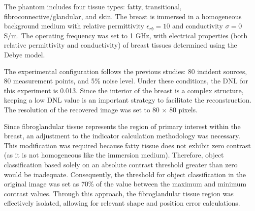 \documentclass{IEEEtran}
\begin{document}
            The phantom includes four tissue types: fatty, transitional, fibroconnective/glandular, and skin. The breast is immersed in a homogeneous background medium with relative permittivity $\epsilon_{rb} = 10$ and conductivity $\sigma = 0$ S/m. The operating frequency was set to 1 GHz, with electrical properties (both relative permittivity and conductivity) of breast tissues determined using the Debye model.

            The experimental configuration follows the previous studies: 80 incident sources, 80 measurement points, and 5\% noise level. Under these conditions, the DNL for this experiment is 0.013. Since the interior of the breast is a complex structure, keeping a low DNL value is an important strategy to facilitate the reconstruction. The resolution of the recovered image was set to 80 $\times$ 80 pixels.

            Since fibroglandular tissue represents the region of primary interest within the breast, an adjustment to the indicator calculation methodology was necessary. This modification was required because fatty tissue does not exhibit zero contrast (as it is not homogeneous like the immersion medium). Therefore, object classification based solely on an absolute contrast threshold greater than zero would be inadequate. Consequently, the threshold for object classification in the original image was set as 70\% of the value between the maximum and minimum contrast values. Through this approach, the fibroglandular tissue region was effectively isolated, allowing for relevant shape and position error calculations.
\end{document}
